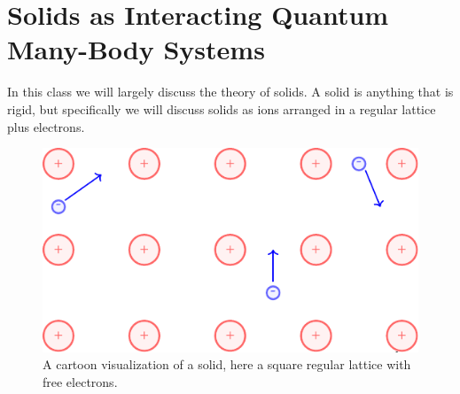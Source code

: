 \section{Solids as Interacting Quantum Many-Body Systems}

In this class we will largely discuss the theory of solids. A solid is anything that is rigid, but specifically we will discuss solids as ions arranged in a regular lattice plus electrons.

\begin{figure}[htbp]
    \centering
    \includegraphics[scale=0.7]{Images/fig-solidcartoon.pdf}
    \caption{A cartoon visualization of a solid, here a square regular lattice with free electrons.}
    \label{fig-solidcartoon}
\end{figure}


